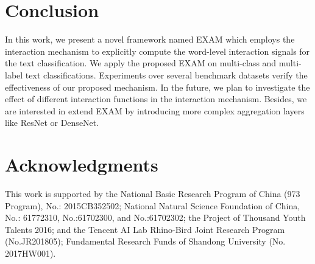 \documentclass[letterpaper]{article} %
\begin{document}
\section{Conclusion}
In this work, we present a novel framework named EXAM which employs the interaction mechanism to explicitly compute the word-level interaction signals for the text classification. We apply the proposed EXAM on multi-class and multi-label text classifications. Experiments over several benchmark datasets verify the effectiveness of our proposed mechanism. In the future, we plan to investigate the effect of different interaction functions in the interaction mechanism. Besides, we are interested in extend EXAM by introducing more complex aggregation layers like ResNet or DenseNet.

\section{ Acknowledgments}
This work is supported by the National Basic Research Program of China (973 Program), No.: 2015CB352502; National Natural Science Foundation of China, No.: 61772310, No.:61702300, and No.:61702302; the Project of Thousand Youth Talents 2016; and the Tencent AI Lab Rhino-Bird Joint Research Program (No.JR201805); Fundamental Research Funds of Shandong University (No. 2017HW001).



\end{document}
